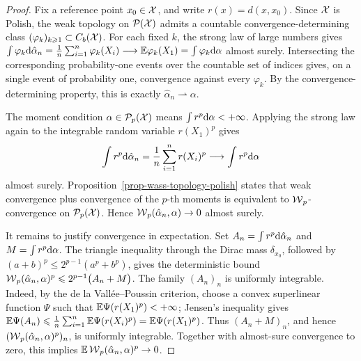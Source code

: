\begin{proof}
	Fix a reference point \(x_0\in\mathcal{X}\), and write \(r(x)=d(x,x_0)\). Since \(\mathcal{X}\) is Polish, the weak topology on \(\mathcal{P}(\mathcal{X})\) admits a countable convergence-determining class \((\varphi_k)_{k\geqslant1}\subset C_b(\mathcal{X})\). For each fixed \(k\), the strong law of large numbers gives
	$\int \varphi_k\mathrm{d}\hat\alpha_n = \frac1n\sum_{i=1}^n\varphi_k(X_i) \longrightarrow \mathbb{E}\varphi_k(X_1) = \int\varphi_k\mathrm{d}\alpha$
	almost surely. Intersecting the corresponding probability-one events over the countable set of indices gives, on a single event of probability one, convergence against every \(\varphi_k\). By the convergence-determining property, this is exactly \(\hat\alpha_n\rightharpoonup\alpha\).

	The moment condition \(\alpha\in\mathcal{P}_p(\mathcal{X})\) means \(\int r^p\mathrm{d}\alpha<+\infty\). Applying the strong law again to the integrable random variable \(r(X_1)^p\) gives
	\[
		\int r^p\mathrm{d}\hat\alpha_n
		=
		\frac1n\sum_{i=1}^n r(X_i)^p
		\longrightarrow
		\int r^p\mathrm{d}\alpha
	\]
	almost surely. Proposition~\ref{prop-wass-topology-polish} states that weak convergence plus convergence of the \(p\)-th moments is equivalent to \(\operatorname{\mathcal{W}}_p\)-convergence on \(\mathcal{P}_p(\mathcal{X})\). Hence \(\operatorname{\mathcal{W}}_p(\hat\alpha_n,\alpha)\to0\) almost surely.

	It remains to justify convergence in expectation. Set \(A_n=\int r^p\mathrm{d}\hat\alpha_n\) and \(M=\int r^p\mathrm{d}\alpha\). The triangle inequality through the Dirac mass \(\delta_{x_0}\), followed by \((a+b)^p\leq2^{p-1}(a^p+b^p)\), gives the deterministic bound
	$\operatorname{\mathcal{W}}_p(\hat\alpha_n,\alpha)^p \leqslant 2^{p-1}\big(A_n+M\big)$.
	The family \((A_n)_n\) is uniformly integrable. Indeed, by the de la Vall\'ee--Poussin criterion, choose a convex superlinear function \(\Psi\) such that \(\mathbb{E}\Psi(r(X_1)^p)<+\infty\); Jensen's inequality gives
	$\mathbb{E}\Psi(A_n) \leqslant \frac1n\sum_{i=1}^n \mathbb{E}\Psi(r(X_i)^p) = \mathbb{E}\Psi(r(X_1)^p)$.
	Thus \((A_n+M)_n\), and hence \((\operatorname{\mathcal{W}}_p(\hat\alpha_n,\alpha)^p)_n\), is uniformly integrable. Together with almost-sure convergence to zero, this implies \(\mathbb{E}\operatorname{\mathcal{W}}_p(\hat\alpha_n,\alpha)^p\to0\).
\end{proof}

